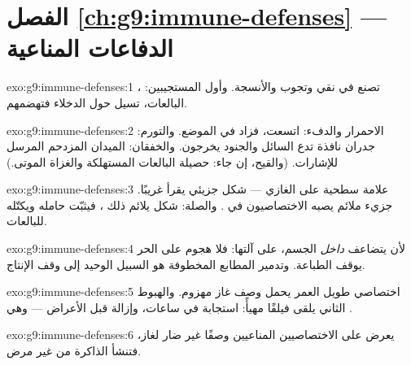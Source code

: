 \section*{الفصل \ref{ch:g9:immune-defenses} --- الدفاعات المناعية}

\begin{solution}{exo:g9:immune-defenses:1}
، تصنع في نقي  وتجوب  والأنسجة.
وأول المستجيبين: البالعات، تسيل حول الدخلاء فتهضمهم.
\end{solution}

\begin{solution}{exo:g9:immune-defenses:2}
الاحمرار والدفء:  اتسعت، فزاد  في الموضع.
والتورم: جدران نافذة تدع السائل والجنود يخرجون.
والخفقان: الميدان المزدحم المرسل للإشارات. (والقيح، إن
جاء: حصيلة البالعات المستهلكة والغزاة الموتى.)
\end{solution}

\begin{solution}{exo:g9:immune-defenses:3}
 علامة سطحية على الغازي --- شكل جزيئي يقرأ
غريبًا.  جزيء ملائم يصبه الاختصاصيون في
. والصلة: شكل  يلائم ذلك ،
فيثبّت حامله ويكتّله للبالعات.
\end{solution}

\begin{solution}{exo:g9:immune-defenses:4}
لأن  يتضاعف \emph{داخل}  الجسم، على آلتها:
فلا هجوم على  الحر يوقف الطباعة. وتدمير 
المطابع المخطوفة هو السبيل الوحيد إلى وقف الإنتاج.
\end{solution}

\begin{solution}{exo:g9:immune-defenses:5}
اختصاصي طويل العمر يحمل وصف غاز مهزوم. والهبوط الثاني
يلقى فيلقًا مهيأً: استجابة في ساعات، وإزالة قبل الأعراض
--- وهي .
\end{solution}

\begin{solution}{exo:g9:immune-defenses:6}
 يعرض على الاختصاصيين المناعيين وصفًا غير ضار
لغاز، فتنشأ الذاكرة من غير مرض.
\end{solution}

